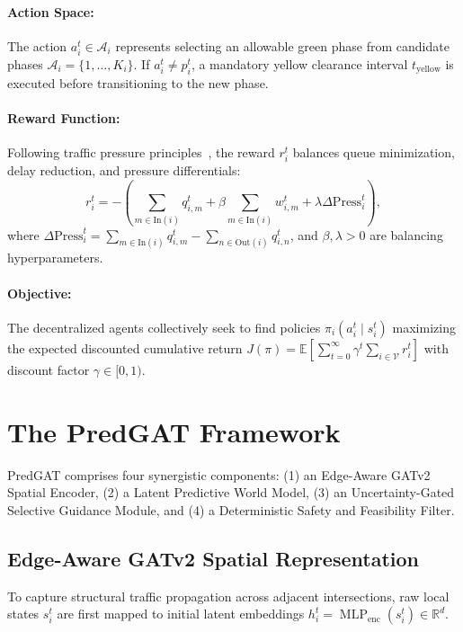 \documentclass[11pt,a4paper]{article}
\begin{document}
\paragraph{Action Space:} The action $a_i^t \in \mathcal{A}_i$ represents selecting an allowable green phase from candidate phases $\mathcal{A}_i = \{1, \dots, K_i\}$. If $a_i^t \neq p_i^t$, a mandatory yellow clearance interval $t_{\text{yellow}}$ is executed before transitioning to the new phase.

\paragraph{Reward Function:} Following traffic pressure principles~\cite{wei2019presslight}, the reward $r_i^t$ balances queue minimization, delay reduction, and pressure differentials:
\begin{equation}
    r_i^t = - \left( \sum_{m \in \text{In}(i)} q_{i,m}^t + \beta \sum_{m \in \text{In}(i)} w_{i,m}^t + \lambda \Delta \text{Press}_i^t \right),
\end{equation}
where $\Delta \text{Press}_i^t = \sum_{m \in \text{In}(i)} q_{i,m}^t - \sum_{n \in \text{Out}(i)} q_{i,n}^t$, and $\beta, \lambda > 0$ are balancing hyperparameters.

\paragraph{Objective:} The decentralized agents collectively seek to find policies $\pi_i(a_i^t \mid s_i^t)$ maximizing the expected discounted cumulative return $J(\pi) = \mathbb{E}\left[ \sum_{t=0}^\infty \gamma^t \sum_{i \in \mathcal{V}} r_i^t \right]$ with discount factor $\gamma \in [0, 1)$.

\section{The PredGAT Framework}
\label{sec:predgat}

PredGAT comprises four synergistic components: (1) an Edge-Aware GATv2 Spatial Encoder, (2) a Latent Predictive World Model, (3) an Uncertainty-Gated Selective Guidance Module, and (4) a Deterministic Safety and Feasibility Filter.

\subsection{Edge-Aware GATv2 Spatial Representation}
To capture structural traffic propagation across adjacent intersections, raw local states $s_i^t$ are first mapped to initial latent embeddings $h_i^t = \operatorname{MLP}_{\text{enc}}(s_i^t) \in \mathbb{R}^d$. 
\end{document}
